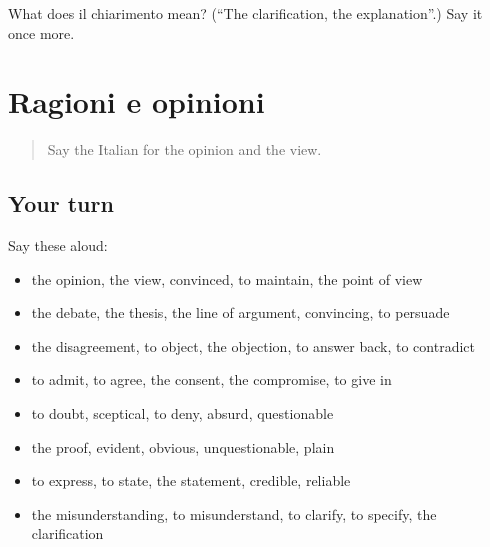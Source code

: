 \begin{tcolorbox}[breakable,colback=teal!4,colframe=teal!35!black,title={Before you move on}]
What does il chiarimento mean? (\textquotedblleft{}The clarification, the explanation\textquotedblright{}.) Say it once more.
\end{tcolorbox}
\section[(dialogue)]{Ragioni e opinioni}

\label{lesson:IT-R346-ripasso-339-346}



\begin{quote}
Say the Italian for the opinion and the view.
\end{quote}

\subsection*{Your turn}
Say these aloud:

\begin{itemize}
\raggedright
  \item the opinion, the view, convinced, to maintain, the point of view
  \item the debate, the thesis, the line of argument, convincing, to persuade
  \item the disagreement, to object, the objection, to answer back, to contradict
  \item to admit, to agree, the consent, the compromise, to give in
  \item to doubt, sceptical, to deny, absurd, questionable
  \item the proof, evident, obvious, unquestionable, plain
  \item to express, to state, the statement, credible, reliable
  \item the misunderstanding, to misunderstand, to clarify, to specify, the clarification
\end{itemize}

